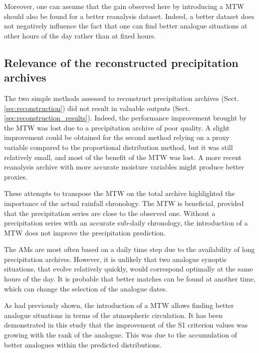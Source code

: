 \documentclass[hess, manuscript]{copernicus}
\begin{document}
	Moreover, one can assume that the gain observed here by introducing a MTW should also be found for a better reanalysis dataset. Indeed, a better dataset does not negatively influence the fact that one can find better analogue situations at other hours of the day rather than at fixed hours.
	
	
	\subsection{Relevance of the reconstructed precipitation archives}
	
	The two simple methods assessed to reconstruct precipitation archives (Sect. \ref{sec:reconstruction}) did not result in valuable outputs (Sect. \ref{sec:reconstruction_results}). Indeed, the performance improvement brought by the MTW was lost due to a precipitation archive of poor quality. A slight improvement could be obtained for the second method relying on a proxy variable compared to the proportional distribution method, but it was still relatively small, and most of the benefit of the MTW was lost. A more recent reanalysis archive with more accurate moisture variables might produce better proxies.
	
	These attempts to transpose the MTW on the total archive highlighted the importance of the actual rainfall chronology. The MTW is beneficial, provided that the precipitation series are close to the observed one. Without a precipitation series with an accurate sub-daily chronology, the introduction of a MTW does not improve the precipitation prediction.
	
	
	
	\conclusions  %
	\label{sec:conclusions}
	
	The AMs are most often based on a daily time step due to the availability of long precipitation archives. However, it is unlikely that two analogue synoptic situations, that evolve relatively quickly, would correspond optimally at the same hours of the day. It is probable that better matches can be found at another time, which can change the selection of the analogue dates.
	
	As \citet{Finet2008} had previously shown, the introduction of a MTW allows finding better analogue situations in terms of the atmospheric circulation. It has been demonstrated in this study that the improvement of the S1 criterion values was growing with the rank of the analogue. This was due to the accumulation of better analogues within the predicted distributions.
	
\end{document}
